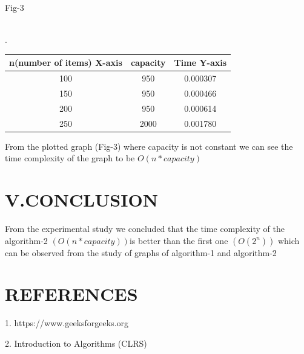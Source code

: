 \documentclass[twocolumn]{article}
\begin{document}
\centerline{Fig-3}\\
 \vspace{2px}.
\begin{center}
	\begin{tabular}{ |c | c | c | }
	\hline
	
n(number of items)
X-axis
&
capacity&
Time
Y-axis







\\
	\hline



100&
950&
0.000307



\\
\hline


150&
950&
0.000466


\\
\hline


200&
950&
0.000614

 \\
	 \hline


250&
2000&
0.001780




\\
\hline
	\end{tabular}
\end{center}



From the plotted graph (Fig-3) where capacity is not constant we can see the time complexity of the graph to  be $O(n*capacity)$
\vfill\eject
\section*{V.CONCLUSION
}
\hfill\begin{minipage}{0.9\linewidth}
From the experimental study we concluded that the time complexity  of the algorithm-2 $(O(n*capacity)) $is  better than the first one $(O(2^n))$ which can be observed from the study of graphs of algorithm-1  and algorithm-2
\end{minipage} 
\section*{REFERENCES    
}


  \phantom{x}\hspace{3ex}   1. https://www.geeksforgeeks.org
      
   \phantom{x}\hspace{0.97ex}   2. Introduction to Algorithms (CLRS)
\end{document}
